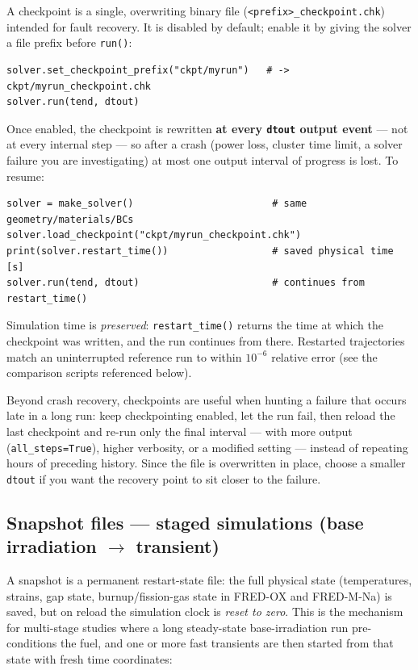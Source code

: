 \documentclass[11pt,a4paper]{article}
\begin{document}
A checkpoint is a single, overwriting binary file
(\texttt{<prefix>\_checkpoint.chk}) intended for fault recovery.  It is
disabled by default; enable it by giving the solver a file prefix before
\texttt{run()}:

\begin{lstlisting}
solver.set_checkpoint_prefix("ckpt/myrun")   # -> ckpt/myrun_checkpoint.chk
solver.run(tend, dtout)
\end{lstlisting}

Once enabled, the checkpoint is rewritten \textbf{at every \texttt{dtout}
output event} --- not at every internal step --- so after a crash (power
loss, cluster time limit, a solver failure you are investigating) at most
one output interval of progress is lost.  To resume:

\begin{lstlisting}
solver = make_solver()                        # same geometry/materials/BCs
solver.load_checkpoint("ckpt/myrun_checkpoint.chk")
print(solver.restart_time())                  # saved physical time [s]
solver.run(tend, dtout)                       # continues from restart_time()
\end{lstlisting}

Simulation time is \emph{preserved}: \texttt{restart\_time()} returns the
time at which the checkpoint was written, and the run continues from there.
Restarted trajectories match an uninterrupted reference run to within
$10^{-6}$ relative error (see the comparison scripts referenced below).

\begin{infobox}
  Beyond crash recovery, checkpoints are useful when hunting a failure that
  occurs late in a long run: keep checkpointing enabled, let the run fail,
  then reload the last checkpoint and re-run only the final interval ---
  with more output (\texttt{all\_steps=True}), higher verbosity, or a
  modified setting --- instead of repeating hours of preceding history.
  Since the file is overwritten in place, choose a smaller \texttt{dtout}
  if you want the recovery point to sit closer to the failure.
\end{infobox}

\subsection{Snapshot files --- staged simulations (base irradiation
$\to$ transient)}

A snapshot is a permanent restart-state file: the full physical state
(temperatures, strains, gap state, burnup/fission-gas state in FRED-OX and
FRED-M-Na) is saved, but on reload the simulation clock is \emph{reset to
zero}.  This is the mechanism for multi-stage studies where a long
steady-state base-irradiation run pre-conditions the fuel, and one or more
fast transients are then started from that state with fresh time
coordinates:
\end{document}
